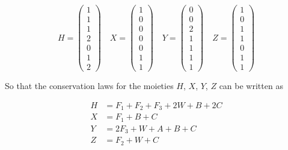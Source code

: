 \documentclass{article}
\newcommand{\ba}{\begin{eqnarray}}
\newcommand{\ea}{\end{eqnarray}}
\begin{document}
\begin{center}
    \begin{equation}
        H=\begin{pmatrix}
            1 \\
            1 \\
            1 \\
            2 \\
            0 \\
            1 \\
            2
\end{pmatrix} \quad
X=\begin{pmatrix}
            1 \\
            0 \\
            0 \\
            0 \\
            0 \\
            1 \\
            1          
\end{pmatrix} \quad
Y=\begin{pmatrix}
            0 \\
            0 \\
            2 \\
            1 \\
            1 \\
            1 \\
            1           
\end{pmatrix} \quad
Z=\begin{pmatrix}
            1 \\
            0 \\
            1 \\
            1 \\
            0 \\
            1 \\
            1
\end{pmatrix}
    \end{equation}
\end{center}

So that the conservation laws for the moieties $H$, $X$, $Y$, $Z$ can be written as

\begin{center}
\ba
H &= F_1 + F_2 + F_3 + 2W + B + 2C\\
         X &= F_1 + B + C\\
          Y &= 2 F_3 + W + A + B + C\\
          Z &= F_2 + W + C
\ea
\end{center}
\end{document}
